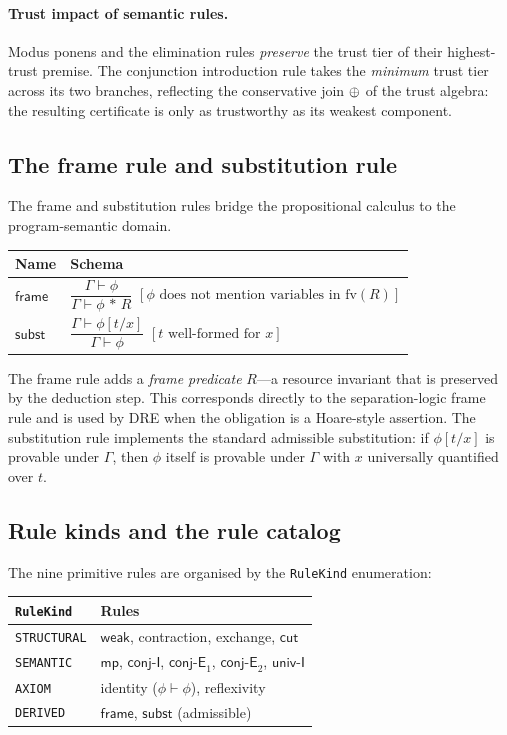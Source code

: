 \documentclass[11pt]{article}
\newcommand{\Prov}[2]{#1 \vdash #2}           %
\newcommand{\MP}{\mathsf{mp}}                 %
\newcommand{\WeakR}{\ensuremath{\mathsf{weak}}}            %
\newcommand{\ConjI}{\mathsf{conj\text{-}I}}   %
\newcommand{\ConjE}{\mathsf{conj\text{-}E}}   %
\newcommand{\UnivI}{\mathsf{univ\text{-}I}}   %
\newcommand{\FrameR}{\mathsf{frame}}          %
\newcommand{\SubstR}{\mathsf{subst}}          %
\newcommand{\CutR}{\ensuremath{\mathsf{cut}}}              %
\begin{document}
\paragraph{Trust impact of semantic rules.}
Modus ponens and the elimination rules \emph{preserve} the trust tier
of their highest-trust premise.  The conjunction introduction rule takes
the \emph{minimum} trust tier across its two branches, reflecting the
conservative join $\oplus$ of the trust algebra: the resulting
certificate is only as trustworthy as its weakest component.

\subsection{The frame rule and substitution rule}

The frame and substitution rules bridge the propositional calculus to
the program-semantic domain.

\begin{center}
\begin{tabular}{ll}
  \toprule
  Name & Schema \\
  \midrule
  $\FrameR$ &
    $\dfrac{\Prov{\Gamma}{\phi}}{\Prov{\Gamma}{\phi \,*\, R}}$
    \quad $[\phi \text{ does not mention variables in } \mathrm{fv}(R)]$ \\[6pt]
  $\SubstR$ &
    $\dfrac{\Prov{\Gamma}{\phi[t/x]}}{\Prov{\Gamma}{\phi}}$
    \quad $[t \text{ well-formed for } x]$ \\
  \bottomrule
\end{tabular}
\end{center}

The frame rule adds a \emph{frame predicate} $R$---a resource invariant
that is preserved by the deduction step.  This corresponds directly to
the separation-logic frame rule and is used by \textsc{DRE} when the
obligation is a Hoare-style assertion.  The substitution rule implements
the standard admissible substitution: if $\phi[t/x]$ is provable under
$\Gamma$, then $\phi$ itself is provable under $\Gamma$ with $x$
universally quantified over $t$.

\subsection{Rule kinds and the rule catalog}

The nine primitive rules are organised by the \lstinline|RuleKind|
enumeration:

\begin{center}
\begin{tabular}{ll}
  \toprule
  \lstinline|RuleKind| & Rules \\
  \midrule
  \lstinline|STRUCTURAL| & \WeakR, contraction, exchange, \CutR \\
  \lstinline|SEMANTIC|   & $\MP$, $\ConjI$, $\ConjE_1$, $\ConjE_2$, $\UnivI$ \\
  \lstinline|AXIOM|      & identity ($\phi \vdash \phi$), reflexivity \\
  \lstinline|DERIVED|    & $\FrameR$, $\SubstR$ (admissible) \\
  \bottomrule
\end{tabular}
\end{center}
\end{document}
